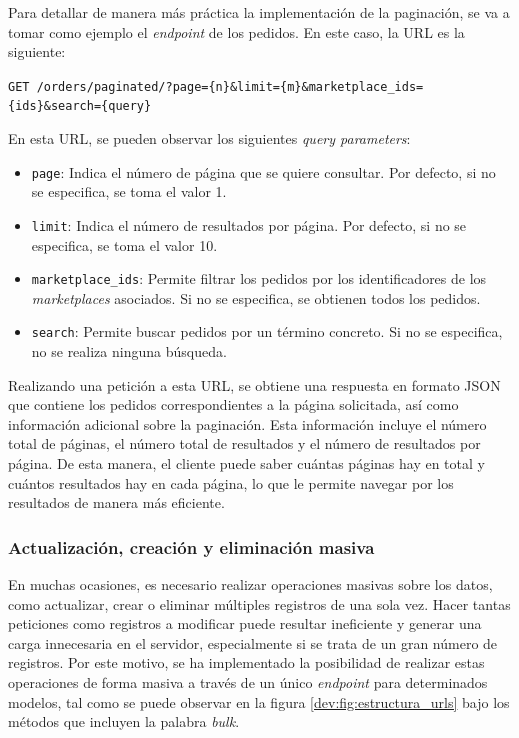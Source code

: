 Para detallar de manera más práctica la implementación de la paginación, se va a tomar como ejemplo el \textit{endpoint} de los pedidos. En este caso, la URL es la siguiente:

\begin{center}
    \texttt{GET /orders/paginated/?page=\{n\}\&limit=\{m\}\&marketplace\_ids=\{ids\}\&search=\{query\}}
\end{center}

En esta URL, se pueden observar los siguientes \textit{query parameters}:
\begin{itemize}
    \item \texttt{page}: Indica el número de página que se quiere consultar. Por defecto, si no se especifica, se toma el valor 1.
    \item \texttt{limit}: Indica el número de resultados por página. Por defecto, si no se especifica, se toma el valor 10.
    \item \texttt{marketplace\_ids}: Permite filtrar los pedidos por los identificadores de los \textit{marketplaces} asociados. Si no se especifica, se obtienen todos los pedidos.
    \item \texttt{search}: Permite buscar pedidos por un término concreto. Si no se especifica, no se realiza ninguna búsqueda.
\end{itemize}

Realizando una petición a esta URL, se obtiene una respuesta en formato JSON que contiene los pedidos correspondientes a la página solicitada, así como información adicional sobre la paginación. Esta información incluye el número total de páginas, el número total de resultados y el número de resultados por página. De esta manera, el cliente puede saber cuántas páginas hay en total y cuántos resultados hay en cada página, lo que le permite navegar por los resultados de manera más eficiente.

\subsubsection{Actualización, creación y eliminación masiva}
\label{dev:subsubsec:actualizacion_creacion_eliminacion_masiva}

En muchas ocasiones, es necesario realizar operaciones masivas sobre los datos, como actualizar, crear o eliminar múltiples registros de una sola vez. Hacer tantas peticiones como registros a modificar puede resultar ineficiente y generar una carga innecesaria en el servidor, especialmente si se trata de un gran número de registros. Por este motivo, se ha implementado la posibilidad de realizar estas operaciones de forma masiva a través de un único \textit{endpoint} para determinados modelos, tal como se puede observar en la figura \ref{dev:fig:estructura_urls} bajo los métodos que incluyen la palabra \textit{bulk}.


